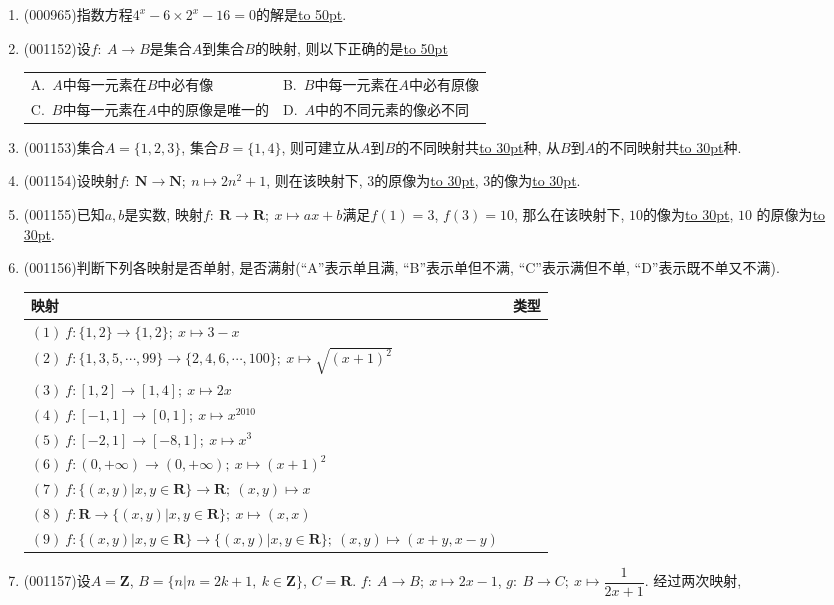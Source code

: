 \documentclass[10pt,a4paper]{article}
\newcommand{\blank}[1]{\underline{\hbox to #1pt{}}}
\newcommand{\twoch}[4]{\par\begin{tabular}{p{.46\textwidth}p{.46\textwidth}}
A.~#1& B.~#2\\
C.~#3& D.~#4
\end{tabular}}
\begin{document}
\begin{enumerate}[1.]
\item {\tiny (000965)}指数方程$4^x-6 \times 2^x-16=0$的解是\blank{50}.
\item {\tiny (001152)}设$f:\ A\rightarrow B$是集合$A$到集合$B$的映射, 则以下正确的是\blank{50}
\twoch{$A$中每一元素在$B$中必有像}{$B$中每一元素在$A$中必有原像}{$B$中每一元素在$A$中的原像是唯一的}{$A$中的不同元素的像必不同}
\item {\tiny (001153)}集合$A=\{1,2,3\}$, 集合$B=\{1,4\}$, 则可建立从$A$到$B$的不同映射共\blank{30}种, 从$B$到$A$的不同映射共\blank{30}种.
\item {\tiny (001154)}设映射$f:\ \mathbf{N}\rightarrow \mathbf{N}; \ n\mapsto 2n^2+1$, 则在该映射下, $3$的原像为\blank{30}, $3$的像为\blank{30}.
\item {\tiny (001155)}已知$a,b$是实数, 映射$f:\ \mathbf{R}\rightarrow \mathbf{R};\ x\mapsto ax+b$满足$f(1)=3$, $f(3)=10$, 那么在该映射下, $10$的像为\blank{30}, $10$ 的原像为\blank{30}.
\item {\tiny (001156)}判断下列各映射是否单射, 是否满射(``A''表示单且满, ``B''表示单但不满, ``C''表示满但不单, ``D''表示既不单又不满).
\begin{center}
\begin{tabular}{|l|c|}
\hline
映射 & 类型\\\hline
$(1) \  f: \{1,2\}\rightarrow \{1,2\};\ x\mapsto 3-x$&\\\hline
$(2) \ f: \{1,3,5,\cdots,99\}\rightarrow \{2,4,6,\cdots,100\};\ x\mapsto \sqrt{(x+1)^2}$&\\\hline
$(3) \ f: [1,2]\rightarrow [1,4];\ x\mapsto 2x$&\\\hline
$(4) \ f: [-1,1]\rightarrow [0,1];\ x\mapsto x^{2010}$&\\\hline
$(5) \ f: [-2,1]\rightarrow [-8,1];\ x\mapsto x^3$&\\\hline
$(6) \ f: (0,+\infty)\rightarrow (0,+\infty);\ x\mapsto (x+1)^2$&\\\hline
$(7) \ f: \{(x,y)|x,y\in \mathbf{R}\}\rightarrow \mathbf{R};\ (x,y)\mapsto x$&\\\hline
$(8) \ f: \mathbf{R}\rightarrow \{(x,y)|x,y\in \mathbf{R}\};\ x\mapsto (x,x)$&\\\hline
$(9) \ f: \{(x,y)|x,y\in \mathbf{R}\}\rightarrow \{(x,y)|x,y\in \mathbf{R}\};\ (x,y)\mapsto (x+y,x-y)$&\\\hline
\end{tabular}
\end{center}
\item {\tiny (001157)}设$A=\mathbf{Z}$, $B=\{n|n=2k+1,\ k\in \mathbf{Z}\}$, $C=\mathbf{R}$. $f:\ A\rightarrow B;\ x\mapsto 2x-1$, $g:\ B\rightarrow C;\ x\mapsto \dfrac{1}{2x+1}$. 经过两次映射,\\ 

\end{enumerate}
\end{document}
